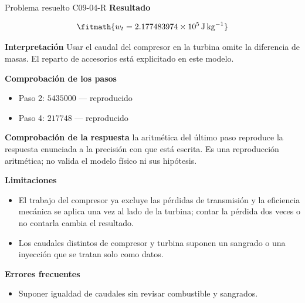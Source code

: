 \documentclass[10pt,openany]{book}
\begin{document}
\begin{studiumworked}{Problema resuelto C09-04-R}
\noindent\textbf{Resultado}

\[
\fitmath{w_t=2.177483974\times10^{5}\,\mathrm{J}\,\mathrm{kg}^{-1}}
\]

\noindent\textbf{Interpretación}
Usar el caudal del compresor en la turbina omite la diferencia de masas. El reparto de accesorios está explicitado en este modelo.

\noindent\textbf{Comprobación de los pasos}
\begin{itemize}
\item Paso 2: $5435000$ — reproducido
\item Paso 4: $217748$ — reproducido
\end{itemize}

\noindent\textbf{Comprobación de la respuesta} la aritmética del último paso reproduce la respuesta enunciada a la precisión con que está escrita. Es una reproducción aritmética; no valida el modelo físico ni sus hipótesis.

\noindent\textbf{Limitaciones}
\begin{itemize}
\item El trabajo del compresor ya excluye las pérdidas de transmisión y la eficiencia mecánica se aplica una vez al lado de la turbina; contar la pérdida dos veces o no contarla cambia el resultado.
\item Los caudales distintos de compresor y turbina suponen un sangrado o una inyección que se tratan solo como datos.
\end{itemize}

\noindent\textbf{Errores frecuentes}
\begin{itemize}
\item Suponer igualdad de caudales sin revisar combustible y sangrados.
\end{itemize}
\end{studiumworked}
\end{document}
